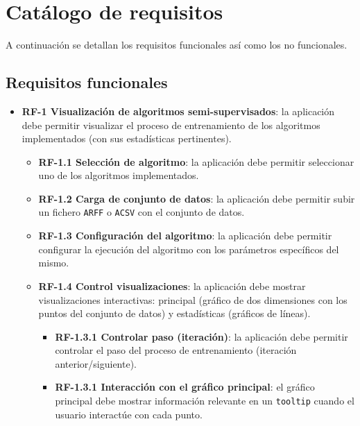\section{Catálogo de requisitos}


A continuación se detallan los requisitos funcionales así como los no
funcionales.

\subsection{Requisitos funcionales}

\begin{itemize}
	\item \textbf{RF-1 Visualización de algoritmos semi-supervisados}: la
	aplicación debe permitir visualizar el proceso de entrenamiento de los
	algoritmos implementados (con sus estadísticas pertinentes).
    \begin{itemize}
        \item \textbf{RF-1.1 Selección de algoritmo}: la aplicación debe
        permitir seleccionar uno de los algoritmos implementados.
        \item \textbf{RF-1.2 Carga de conjunto de datos}: la aplicación debe
        permitir subir un fichero \texttt{ARFF} o \texttt{ACSV} con el conjunto
        de datos. 
        \item \textbf{RF-1.3 Configuración del algoritmo}: la aplicación debe
        permitir configurar la ejecución del algoritmo con los parámetros
        específicos del mismo.
        \item \textbf{RF-1.4 Control visualizaciones}: la aplicación debe
        mostrar visualizaciones interactivas: principal (gráfico de dos
        dimensiones con los puntos del conjunto de datos) y estadísticas
        (gráficos de líneas).
        \begin{itemize}
            \item \textbf{RF-1.3.1 Controlar paso (iteración)}: la aplicación
            debe permitir controlar el paso del proceso de entrenamiento
            (iteración anterior/siguiente).
            \item \textbf{RF-1.3.1 Interacción con el gráfico principal}: el
            gráfico principal debe mostrar información relevante en un
            \texttt{tooltip} cuando el usuario interactúe con cada punto.
        \end{itemize}
    \end{itemize}
    

\end{itemize}
